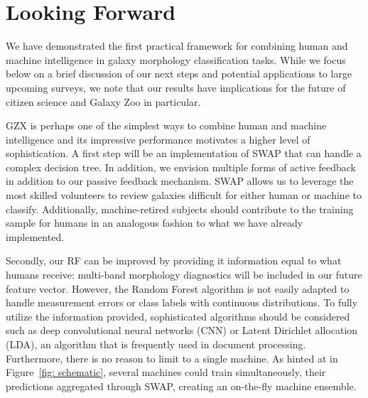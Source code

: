 \documentclass[twocolumn,  trackchanges, ]{aastex6}%
\begin{document}
\section{Looking Forward}\label{sec: visions}

We have demonstrated the first practical framework for combining human and machine  intelligence in galaxy morphology classification tasks. While we focus below on a brief discussion of our next steps and potential applications to large upcoming surveys, we note that our results have implications for the future of citizen science and Galaxy Zoo in particular. 

GZX is perhaps one of the simplest ways to combine human and machine intelligence and its impressive performance motivates a higher level of sophistication. A first step will be an implementation of SWAP that can handle a complex decision tree. In addition, we envision multiple forms of active feedback in addition to our passive feedback mechanism.  SWAP allows us to leverage the most skilled volunteers to review galaxies difficult for either human or machine to classify.  Additionally, machine-retired subjects should contribute to the training sample for humans in an analogous fashion to what we have already implemented. 

Secondly, our RF can be improved by providing it information equal to what humans receive: multi-band morphology diagnostics will be included in our future feature vector.  However, the Random Forest algorithm is not easily adapted to handle measurement errors or class labels with continuous distributions.  To fully utilize the information provided, sophisticated algorithms should be considered such as deep convolutional neural networks (CNN) or Latent Dirichlet allocation (LDA), an algorithm that is frequently used in document processing.  Furthermore, there is no reason to limit to a single machine. As hinted at in Figure~\ref{fig: schematic}, several machines could train simultaneously, their predictions aggregated through SWAP, creating an on-the-fly machine ensemble.

\end{document}
